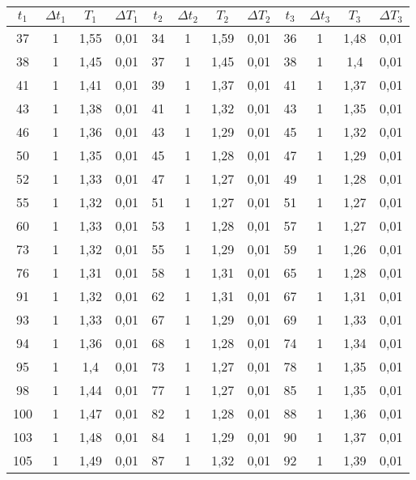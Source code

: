 \documentclass[a4paper,12pt,spanish]{article}
\begin{document}
	
	\begin{longtable}{|*{12}{c|}}
		 
		
		\hline
		$t_1$ & $\Delta t_1$ & $T_1$ & $\Delta T_1$ & $t_2$ & $\Delta t_2$ & $T_2$ & $\Delta T_2$ & $t_3$ & $\Delta t_3$ & $T_3$ & $\Delta T_3$ \\ \hline \hline
		37 & 1 & 1,55 & 0,01 & 34 & 1 & 1,59 & 0,01 & 36 & 1 & 1,48 & 0,01 \\ \hline 
		38 & 1 & 1,45 & 0,01 & 37 & 1 & 1,45 & 0,01 & 38 & 1 & 1,4 & 0,01 \\ \hline 
		41 & 1 & 1,41 & 0,01 & 39 & 1 & 1,37 & 0,01 & 41 & 1 & 1,37 & 0,01 \\ \hline 
		43 & 1 & 1,38 & 0,01 & 41 & 1 & 1,32 & 0,01 & 43 & 1 & 1,35 & 0,01 \\ \hline 
		46 & 1 & 1,36 & 0,01 & 43 & 1 & 1,29 & 0,01 & 45 & 1 & 1,32 & 0,01 \\ \hline 
		50 & 1 & 1,35 & 0,01 & 45 & 1 & 1,28 & 0,01 & 47 & 1 & 1,29 & 0,01 \\ \hline 
		52 & 1 & 1,33 & 0,01 & 47 & 1 & 1,27 & 0,01 & 49 & 1 & 1,28 & 0,01 \\ \hline 
		55 & 1 & 1,32 & 0,01 & 51 & 1 & 1,27 & 0,01 & 51 & 1 & 1,27 & 0,01 \\ \hline 
		60 & 1 & 1,33 & 0,01 & 53 & 1 & 1,28 & 0,01 & 57 & 1 & 1,27 & 0,01 \\ \hline 
		73 & 1 & 1,32 & 0,01 & 55 & 1 & 1,29 & 0,01 & 59 & 1 & 1,26 & 0,01 \\ \hline 
		76 & 1 & 1,31 & 0,01 & 58 & 1 & 1,31 & 0,01 & 65 & 1 & 1,28 & 0,01 \\ \hline 
		91 & 1 & 1,32 & 0,01 & 62 & 1 & 1,31 & 0,01 & 67 & 1 & 1,31 & 0,01 \\ \hline 
		93 & 1 & 1,33 & 0,01 & 67 & 1 & 1,29 & 0,01 & 69 & 1 & 1,33 & 0,01 \\ \hline 
		94 & 1 & 1,36 & 0,01 & 68 & 1 & 1,28 & 0,01 & 74 & 1 & 1,34 & 0,01 \\ \hline 
		95 & 1 & 1,4 & 0,01 & 73 & 1 & 1,27 & 0,01 & 78 & 1 & 1,35 & 0,01 \\ \hline 
		98 & 1 & 1,44 & 0,01 & 77 & 1 & 1,27 & 0,01 & 85 & 1 & 1,35 & 0,01 \\ \hline 
		100 & 1 & 1,47 & 0,01 & 82 & 1 & 1,28 & 0,01 & 88 & 1 & 1,36 & 0,01 \\ \hline 
		103 & 1 & 1,48 & 0,01 & 84 & 1 & 1,29 & 0,01 & 90 & 1 & 1,37 & 0,01 \\ \hline 
		105 & 1 & 1,49 & 0,01 & 87 & 1 & 1,32 & 0,01 & 92 & 1 & 1,39 & 0,01 \\ \hline 

\end{longtable}
\end{document}

